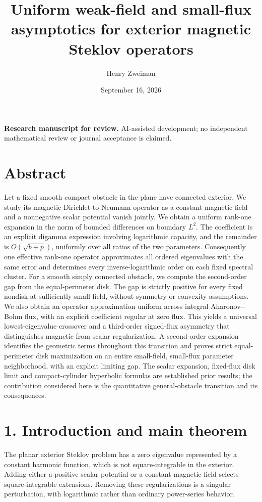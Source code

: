 \documentclass[11pt]{article}
\title{Uniform weak-field and small-flux asymptotics for exterior magnetic Steklov operators}
\author{Henry Zweiman}
\date{September 16, 2026}
\begin{document}
\maketitle
\textbf{Research manuscript for review.} AI-assisted development; no
independent mathematical review or journal acceptance is claimed.

\section{Abstract}\label{abstract}

Let a fixed smooth compact obstacle in the plane have connected
exterior. We study its magnetic Dirichlet-to-Neumann operator as a
constant magnetic field and a nonnegative scalar potential vanish
jointly. We obtain a uniform rank-one expansion in the norm of bounded
differences on boundary \(L^2\). The coefficient is an explicit digamma
expression involving logarithmic capacity, and the remainder is
\(O(\sqrt{b+p})\), uniformly over all ratios of the two parameters.
Consequently one effective rank-one operator approximates all ordered
eigenvalues with the same error and determines every inverse-logarithmic
order on each fixed spectral cluster. For a smooth simply connected
obstacle, we compute the second-order gap from the equal-perimeter disk.
The gap is strictly positive for every fixed nondisk at sufficiently
small field, without symmetry or convexity assumptions. We also obtain
an operator approximation uniform across integral Aharonov-\/-Bohm flux,
with an explicit coefficient regular at zero flux. This yields a
universal lowest-eigenvalue crossover and a third-order signed-flux
asymmetry that distinguishes magnetic from scalar regularization. A
second-order expansion identifies the geometric terms throughout this
transition and proves strict equal-perimeter disk maximization on an
entire small-field, small-flux parameter neighborhood, with an explicit
limiting gap. The scalar expansion, fixed-flux disk limit and
compact-cylinder hyperbolic formulas are established prior results; the
contribution considered here is the quantitative general-obstacle
transition and its consequences.

\section{1. Introduction and main
theorem}\label{introduction-and-main-theorem}

The planar exterior Steklov problem has a zero eigenvalue represented by
a constant harmonic function, which is not square-integrable in the
exterior. Adding either a positive scalar potential or a constant
magnetic field selects square-integrable extensions. Removing these
regularizations is a singular perturbation, with logarithmic rather than
ordinary power-series behavior.
\end{document}
